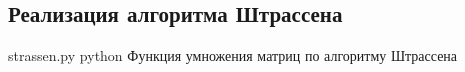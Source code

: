 \begin{appendices}
	\chapter{Реализация алгоритма Штрассена}
	\label{strassen}
	{strassen.py} %
	{python} %
	{Функция умножения матриц по алгоритму Штрассена} %
	
\end{appendices}